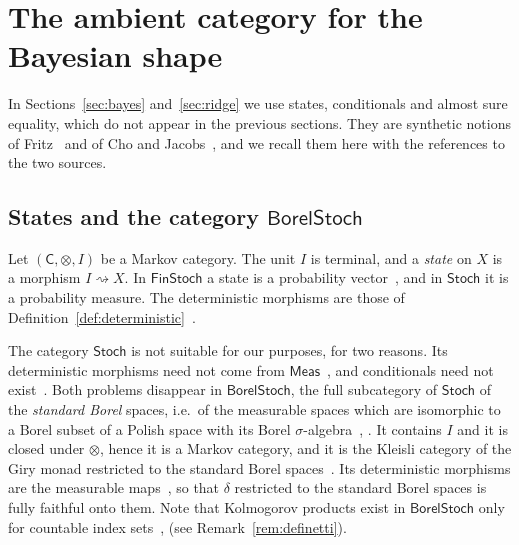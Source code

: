 \documentclass[11pt,a4paper]{article}
\theoremstyle{plain}
\theoremstyle{definition}
\theoremstyle{remark}
\newcommand{\cat}[1]{\mathsf{#1}}
\newcommand{\Meas}{\cat{Meas}}
\newcommand{\Stoch}{\cat{Stoch}}
\newcommand{\FinStoch}{\cat{FinStoch}}
\newcommand{\del}{\delta}
\newcommand{\BorelStoch}{\cat{BorelStoch}}
\begin{document}
\section{The ambient category for the Bayesian shape}\label{sec:ambient}

In Sections~\ref{sec:bayes} and~\ref{sec:ridge} we use states, conditionals and
almost sure equality, which do not appear in the previous sections. They are
synthetic notions of Fritz~\cite{fritz_synthetic_2020} and of Cho and
Jacobs~\cite{cho_disintegration_2019}, and we recall them here with the
references to the two sources.

\subsection{States and the category \texorpdfstring{$\BorelStoch$}{BorelStoch}}

Let $(\cat C,\otimes,I)$ be a Markov category. The unit $I$ is terminal, and a
\emph{state} on $X$ is a morphism $I \rightsquigarrow X$. In $\FinStoch$ a
state is a probability vector~\cite[Ex.~2.5]{fritz_synthetic_2020}, and in
$\Stoch$ it is a probability measure. The deterministic morphisms are those of
Definition~\ref{def:deterministic}~\cite[Def.~10.1]{fritz_synthetic_2020}.

The category $\Stoch$ is not suitable for our purposes, for two reasons. Its
deterministic morphisms need not come from
$\Meas$~\cite[Ex.~10.4]{fritz_synthetic_2020}, and conditionals need not
exist~\cite[Ex.~11.3]{fritz_synthetic_2020}. Both problems disappear in
$\BorelStoch$, the full subcategory of $\Stoch$ of the \emph{standard Borel}
spaces, i.e.\ of the measurable spaces which are isomorphic to a Borel subset
of a Polish space with its Borel
$\sigma$-algebra~\cite[p.~21]{fritz_synthetic_2020},
\cite[p.~12]{cho_disintegration_2019}. It contains $I$ and it is closed under
$\otimes$, hence it is a Markov category, and it is the Kleisli category of the
Giry monad restricted to the standard Borel
spaces~\cite[p.~12]{cho_disintegration_2019}. Its deterministic morphisms are
the measurable maps~\cite[Ex.~10.5]{fritz_synthetic_2020}, so that $\del$
restricted to the standard Borel spaces is fully faithful onto them. Note that
Kolmogorov products exist in $\BorelStoch$ only for countable index
sets~\cite[p.~21]{fritz_synthetic_2020},
\cite[Ex.~3.6]{fritz_rischel_infinite_2020} (see
Remark~\ref{rem:definetti}).
\end{document}
